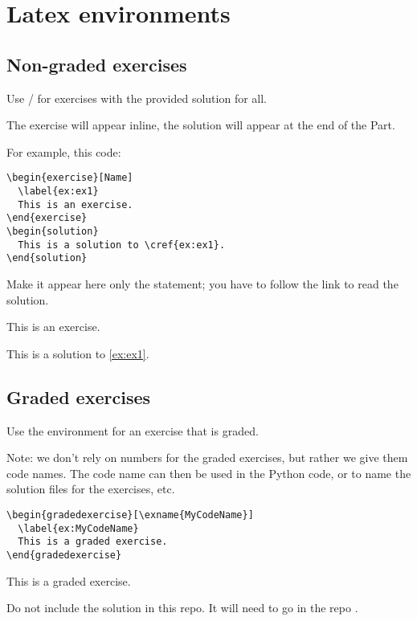 
\section{Latex environments}

\subsection{Non-graded exercises}

Use / for exercises with the provided solution for all.

The exercise will appear inline, the solution will appear at the end of the Part.

For example, this code:

\begin{verbatim}
\begin{exercise}[Name]
  \label{ex:ex1}
  This is an exercise.
\end{exercise}
\begin{solution}
  This is a solution to \cref{ex:ex1}.
\end{solution}
\end{verbatim}

Make it appear here only the statement; you have to follow the link to read the solution.

\begin{exercise}[Name]
	\label{ex:ex1}
	This is an exercise.
\end{exercise}
\begin{solution}
	This is a solution to \cref{ex:ex1}.
\end{solution}

\subsection{Graded exercises}

Use the environment  for an exercise that is graded.

Note: we don't rely on numbers for the graded exercises, but rather we give them code names.
The code name can then be used in the Python code, or to name the solution files for the exercises, etc.

\begin{verbatim}
\begin{gradedexercise}[\exname{MyCodeName}] 
  \label{ex:MyCodeName}
  This is a graded exercise.
\end{gradedexercise}
\end{verbatim}

\begin{gradedexercise}
	This is a graded exercise.
\end{gradedexercise}

Do not include the solution in this repo.
It will need to go in the repo .

